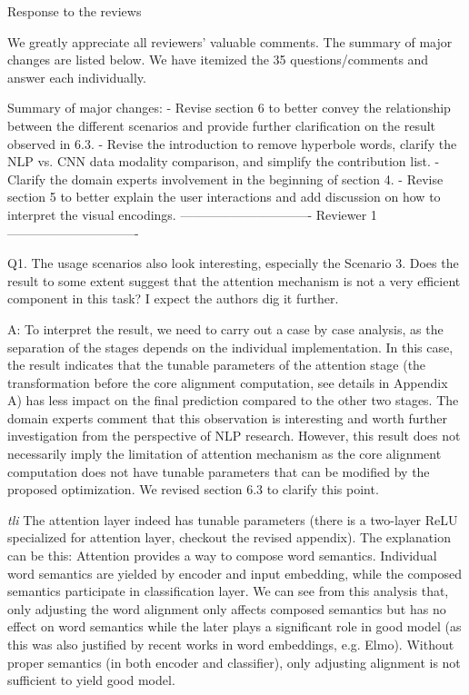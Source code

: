 Response to the reviews

We greatly appreciate all reviewers' valuable comments. The summary of major changes are listed below. We have itemized the 35 questions/comments and answer each individually.

Summary of major changes:
- Revise section 6 to better convey the relationship between the different scenarios and provide further clarification on the result observed in 6.3.
- Revise the introduction to remove hyperbole words, clarify the NLP vs. CNN data modality comparison, and simplify the contribution list.
- Clarify the domain experts involvement in the beginning of section 4.
- Revise section 5 to better explain the user interactions and add discussion on how to interpret the visual encodings.
------------------------------- Reviewer 1 -------------------------------


Q1. The usage scenarios also look interesting, especially the Scenario 3. Does the result to some extent suggest that the attention mechanism is not a very efficient component in this task? I expect the authors dig it further.

A: To interpret the result, we need to carry out a case by case analysis, as the separation of the stages depends on the individual implementation. In this case, the result indicates that the tunable parameters of the attention stage (the transformation before the core alignment computation, see details in Appendix A) has less impact on the final prediction compared to the other two stages. The domain experts comment that this observation is interesting and worth further investigation from the perspective of NLP research. However, this result does not necessarily imply the limitation of attention mechanism as the core alignment computation does not have tunable parameters that can be modified by the proposed optimization. We revised section 6.3 to clarify this point.

\emph{tli} The attention layer indeed has tunable parameters (there is a two-layer ReLU specialized for attention layer, checkout the revised appendix). The explanation can be this: Attention provides a way to compose word semantics. Individual word semantics are yielded by encoder and input embedding, while the composed semantics participate in classification layer. We can see from this analysis that, only adjusting the word alignment only affects composed semantics but has no effect on word semantics while the later plays a significant role in good model (as this was also justified by recent works in word embeddings, e.g. Elmo). Without proper semantics (in both encoder and classifier), only adjusting alignment is not sufficient to yield good model.


